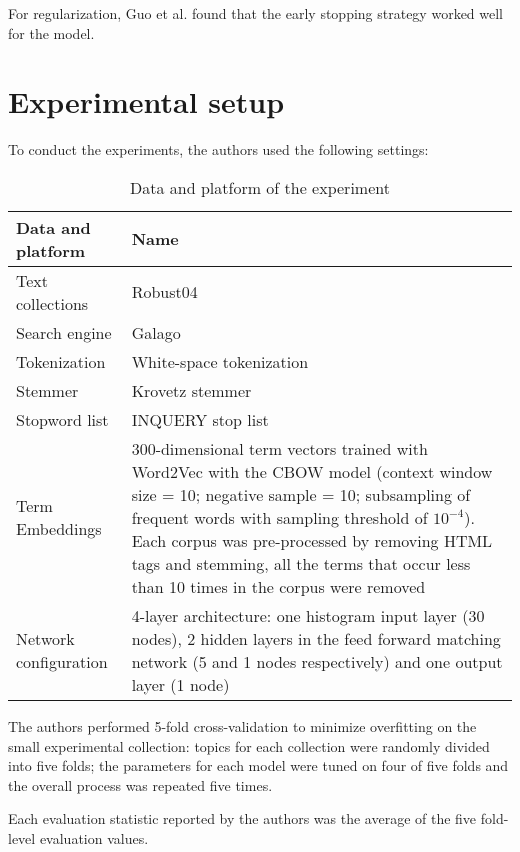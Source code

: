 For regularization, Guo et al. \cite{drmm} found that the early stopping strategy worked well for
the model.

\section{Experimental setup}

To conduct the experiments, the authors used the following settings:

\begin{table}[H]
\begin{center}
\begin{tabular}{p{5cm} p{8cm}}
\textbf{Data and platform} & \textbf{Name} \\ \hline
Text collections & Robust04 \cite{rob04} \\
Search engine & Galago \tablefootnote{\url{https://sourceforge.net/p/lemur/wiki/Galago}} \\
Tokenization & White-space tokenization \\
Stemmer & Krovetz stemmer \\
Stopword list & INQUERY stop list \tablefootnote{\url{https://github.com/igorbrigadir/stopwords/blob/master/en/indri.txt}} \\ 
Term Embeddings & 300-dimensional term vectors trained with Word2Vec \cite{w2v} with the CBOW model
(context window size = 10; negative sample = 10; subsampling of frequent words
with sampling threshold of $10^{-4}$). Each corpus was pre-processed by
removing HTML tags and stemming, all the terms that occur less than 10 times in
the corpus were removed \\
Network configuration & 4-layer architecture: one histogram input layer
(30 nodes), 2 hidden layers in the feed forward matching network (5 and 1 nodes
respectively) and one output layer (1 node) \\ \hline
\end{tabular}
\caption{Data and platform of the experiment}
\end{center}
\end{table}

The authors performed 5-fold cross-validation to minimize overfitting on the small experimental collection: topics for each collection were randomly
divided into five folds; the parameters for each model were tuned on four of five folds and the overall process was repeated five times.

Each evaluation statistic reported by the authors was the average of the five fold-level evaluation values.


